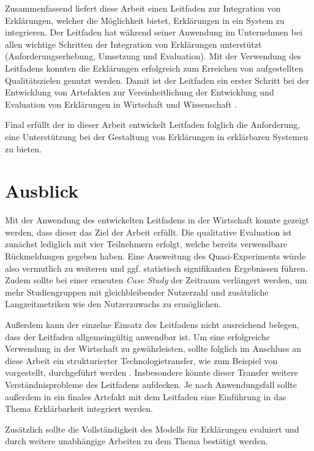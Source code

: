 Zusammenfassend liefert diese Arbeit einen Leitfaden zur Integration von Erklärungen, welcher die Möglichkeit bietet, Erklärungen in ein System zu integrieren. Der Leitfaden hat während seiner Anwendung im Unternehmen bei allen wichtige Schritten der Integration von Erklärungen unterstützt (Anforderungserhebung, Umsetzung und Evaluation). Mit der Verwendung des Leitfadens konnten die Erklärungen erfolgreich zum Erreichen von aufgestellten Qualitätszielen genutzt werden. Damit ist der Leitfaden ein erster Schritt bei der Entwicklung von Artefakten zur Vereinheitlichung der Entwicklung und Evaluation von Erklärungen in Wirtschaft und Wissenschaft \cite{kohl_explainability_2019,lim_2009_assessing,sokol_explainability_2020}.

Final erfüllt der in dieser Arbeit entwickelt Leitfaden folglich die Anforderung, eine Unterstützung bei der Gestaltung von Erklärungen in erklärbaren Systemen zu bieten.

\section{Ausblick}

Mit der Anwendung des entwickelten Leitfadens in der Wirtschaft konnte gezeigt werden, dass dieser das Ziel der Arbeit erfüllt. Die qualitative Evaluation ist zunächst lediglich mit vier Teilnehmern erfolgt, welche bereits verwendbare Rückmeldungen gegeben haben. Eine Ausweitung des Quasi-Experiments würde also vermutlich zu weiteren und ggf. statistisch signifikanten Ergebnissen führen. Zudem sollte bei einer erneuten \textit{Case Study} der Zeitraum verlängert werden, um mehr Studiengruppen mit gleichbleibender Nutzerzahl und zusätzliche Langzeitmetriken wie den Nutzerzuwachs zu ermöglichen.

Außerdem kann der einzelne Einsatz des Leitfadens nicht ausreichend belegen, dass der Leitfaden allgemeingültig anwendbar ist. Um eine erfolgreiche Verwendung in der Wirtschaft zu gewährleisten, sollte folglich im Anschluss an diese Arbeit ein strukturierter Technologietransfer, wie zum Beispiel von \citeauthor{4012630} vorgestellt, durchgeführt werden \cite{4012630}. Insbesondere könnte dieser Transfer weitere Verständnisprobleme des Leitfadens aufdecken. Je nach Anwendungsfall sollte außerdem in ein finales Artefakt mit dem Leitfaden eine Einführung in das Thema Erklärbarkeit integriert werden.

Zusätzlich sollte die Vollständigkeit des Modells für Erklärungen evaluiert und durch weitere unabhängige Arbeiten zu dem Thema bestätigt werden.

